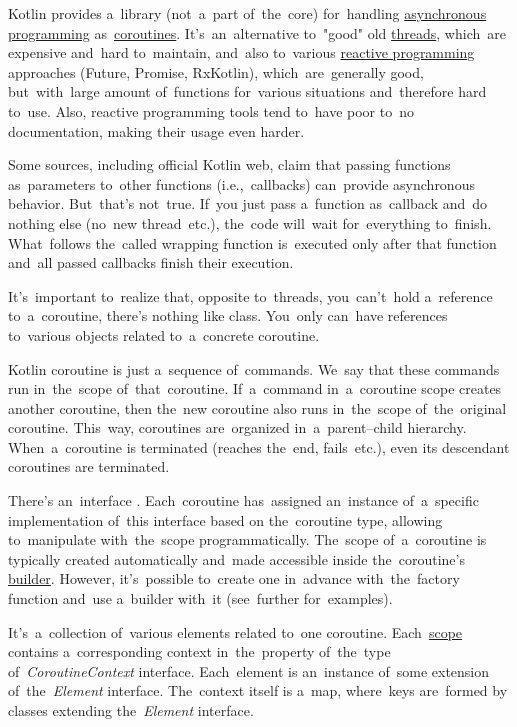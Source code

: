 \label{kotlincoroutine}
Kotlin provides a~library (not~a~part of~the~core) for~handling \hyperref[concurrentparallelasynchronous]{asynchronous programming} as~\hyperref[coroutines]{coroutines}.
It's~an~alternative to~"good" old \hyperref[coroutines]{threads}, which~are expensive and~hard to~maintain, and~also to~various \hyperref[reactiveprogramming]{reactive programming} approaches (Future, Promise, RxKotlin), which~are~generally good, but~with~large amount of~functions for~various situations and~therefore hard to~use.
Also, reactive programming tools tend to~have poor to~no documentation, making their usage even harder.

\warning Some sources, including official Kotlin web, claim that passing functions as~parameters to~other functions (i.e.,~callbacks) can~provide asynchronous behavior.
But~that's not~true.
If~you just pass a~function as~callback and~do nothing else \mbox{(no new} \mbox{thread etc.)}, the~code will~wait for~everything to~finish.
What~follows the~called wrapping function is~executed only after that function and~all passed callbacks finish their execution.

\warning It's~important to~realize that, opposite to~threads, you~can't~hold a~reference to~a~coroutine, there's nothing like  class.
You~only can~have references to~various objects related to~a~concrete coroutine.

\label{kotlincoroutinescope}
Kotlin coroutine is just a~sequence of~commands.
We~say that these commands run in~the~scope of~that~coroutine.
If~a~command in~a~coroutine scope creates another coroutine, then the~new coroutine also runs in~the~scope of~the~original coroutine.
This~way, coroutines are~organized in~a~parent--child hierarchy.
When~a~coroutine is terminated (reaches the~end, fails~etc.), even its descendant coroutines are terminated.

There's an~interface .
Each~coroutine has~assigned an~instance of~a~specific implementation of~this interface based on the~coroutine type, allowing to~manipulate with~the~scope programmatically.
The~scope of~a~coroutine is typically created automatically and~made accessible inside the~coroutine's \hyperref[kotlincoroutinebuilder]{builder}.
However, it's~possible to~create one in~advance with~the~factory function  and~use a~builder with~it (see~further for~examples).

\label{kotlincoroutinecontext}
It's~a~collection of~various elements related to~one coroutine.
Each~\hyperref[kotlincoroutinescope]{scope} contains a~corresponding context in~the~property  of~the~type \mbox{of \textit{CoroutineContext}} interface.
Each~element is an~instance of~some extension \mbox{of the \textit{Element}} interface.
The~context itself is a~map, where~keys are~formed by classes extending \mbox{the \textit{Element}} interface.

